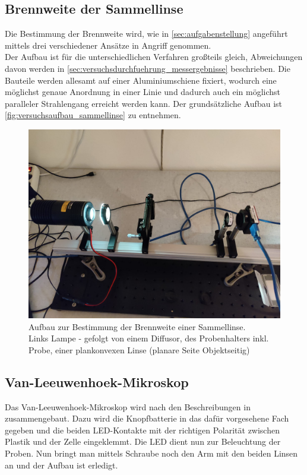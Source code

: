 \documentclass[ngerman]{scrartcl}
\begin{document}
\subsection{Brennweite der Sammellinse}
\label{sec:versuchsanordnung_sammellinse}
Die Bestimmung der Brennweite wird, wie in \autoref{sec:aufgabenstellung} angeführt mittels drei verschiedener Ansätze in Angriff genommen. \\
Der Aufbau ist für die unterschiedlichen Verfahren großteils gleich, Abweichungen davon werden in \autoref{sec:versuchsdurchfuehrung_messergebnisse} beschrieben. Die Bauteile werden allesamt auf einer Aluminiumschiene fixiert, wodurch eine möglichst genaue Anordnung in einer Linie und dadurch auch ein möglichst paralleler Strahlengang erreicht werden kann. 
Der grundsätzliche Aufbau ist \autoref{fig:versuchsaufbau_sammellinse} zu entnehmen. 
\begin{figure}[H]
    \centering
    \begin{samepage}
        \includegraphics[width=\linewidth]{fig/versuch1.jpeg}
        \caption[Aufbau Brennweite einer Sammellinse bestimmen]{Aufbau zur Bestimmung der Brennweite einer Sammellinse. \\Links Lampe - gefolgt von einem Diffusor, des Probenhalters inkl. Probe, einer plankonvexen Linse (planare Seite Objektseitig)}
        \label{fig:versuchsaufbau_sammellinse}
    \end{samepage}
\end{figure}
%
\subsection{Van-Leeuwenhoek-Mikroskop}
Das Van-Leeuwenhoek-Mikroskop wird nach den Beschreibungen in \cite{ref:angabe} zusammengebaut. Dazu wird die Knopfbatterie in das dafür vorgesehene Fach gegeben und die beiden LED-Kontakte mit der richtigen Polarität zwischen Plastik und der Zelle eingeklemmt. Die LED dient nun zur Beleuchtung der Proben. Nun bringt man mittels Schraube noch den Arm mit den beiden Linsen an und der Aufbau ist erledigt. 
%
\end{document}
